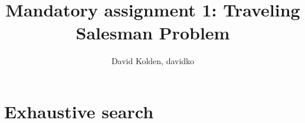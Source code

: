 \documentclass{article}
\author{David Kolden, davidko}
\title{Mandatory assignment 1: Traveling Salesman Problem}
\begin{document}
\maketitle
\section{Exhaustive search}
\end{document}

